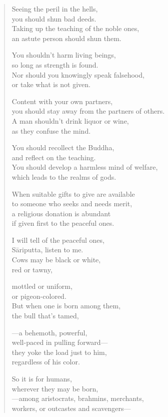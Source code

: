 \documentclass[12pt,openany]{book}%
\begin{document}
\begin{verse}%
Seeing the peril in the hells, \\
you should shun bad deeds. \\
Taking up the teaching of the noble ones, \\
an astute person should shun them. 

You shouldn’t harm living beings, \\
so long as strength is found. \\
Nor should you knowingly speak falsehood, \\
or take what is not given. 

Content with your own partners, \\
you should stay away from the partners of others. \\
A man shouldn’t drink liquor or wine, \\
as they confuse the mind. 

You should recollect the Buddha, \\
and reflect on the teaching. \\
You should develop a harmless mind of welfare, \\
which leads to the realms of gods. 

When suitable gifts to give are available \\
to someone who seeks and needs merit, \\
a religious donation is abundant \\
if given first to the peaceful ones. 

I will tell of the peaceful ones, \\
\textsanskrit{Sāriputta}, listen to me. \\
Cows may be black or white, \\
red or tawny, 

mottled or uniform, \\
or pigeon-colored. \\
But when one is born among them, \\
the bull that’s tamed, 

—a behemoth, powerful, \\
well-paced in pulling forward—\\
they yoke the load just to him, \\
regardless of his color. 

So it is for humans, \\
wherever they may be born, \\
—among aristocrats, brahmins, merchants, \\
workers, or outcastes and scavengers—


\end{verse}
\end{document}

